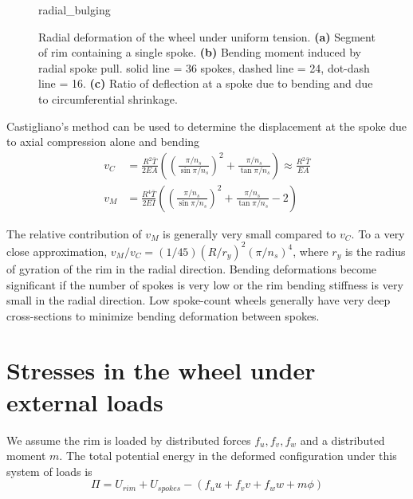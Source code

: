 \documentclass[../thesis.tex]{subfiles}
\begin{document}
\begin{figure}
\centering
{radial_bulging}
\caption{Radial deformation of the wheel under uniform tension. \textbf{(a)} Segment of rim containing a single spoke. \textbf{(b)} Bending moment induced by radial spoke pull. solid line = 36 spokes, dashed line = 24, dot-dash line = 16. \textbf{(c)} Ratio of deflection at a spoke due to bending and due to circumferential shrinkage.}
\label{fig:radial_bulging}
\end{figure}

Castigliano's method can be used to determine the displacement at the spoke due to axial compression alone and bending
\begin{align}
v_C &= \frac{R^2\bar{T}}{2EA} \left( \left(\frac{\pi/n_s}{\sin{\pi/n_s}}\right)^2 +
    \frac{\pi/n_s}{\tan{\pi/n_s}}\right)
    \approx \frac{R^2\bar{T}}{EA}\label{eq:vC}\\
v_M &= \frac{R^4\bar{T}}{2EI} \left( \left(\frac{\pi/n_s}{\sin{\pi/n_s}}\right)^2 +
    \frac{\pi/n_s}{\tan{\pi/n_s}} - 2\right)\label{eq:vM}
\end{align}

The relative contribution of $v_M$ is generally very small compared to $v_C$. To a very close approximation, $v_M/v_C=(1/45)(R/r_y)^2(\pi/n_s)^4$, where $r_y$ is the radius of gyration of the rim in the radial direction. Bending deformations become significant if the number of spokes is very low or the rim bending stiffness is very small in the radial direction. Low spoke-count wheels generally have very deep cross-sections to minimize bending deformation between spokes.


\section{Stresses in the wheel under external loads}

We assume the rim is loaded by distributed forces $f_u,f_v,f_w$ and a distributed moment $m$. The total potential energy in the deformed configuration under this system of loads is
\begin{equation}
\label{eq:TotPot}
\Pi = U_{rim} + U_{spokes} - (f_uu+f_vv+f_ww+m\phi)
\end{equation}
\end{document}
